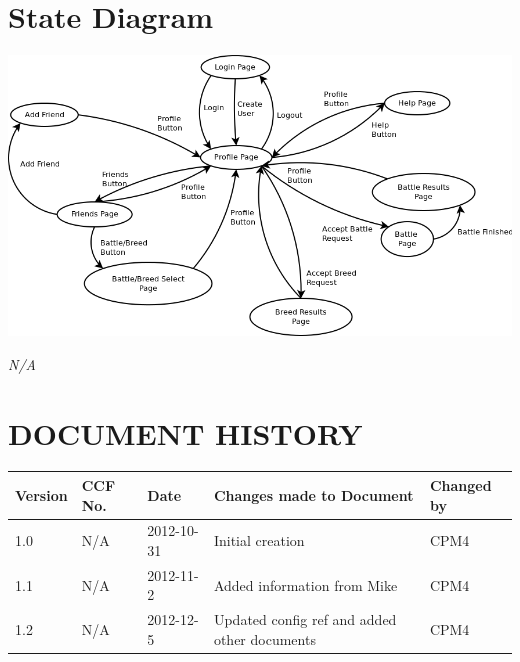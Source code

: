 \documentclass{project}
\begin{document}
\section{State Diagram}
\begin{center}
\includegraphics[scale=0.50]{state_diagram.png}
\end{center}



\clearpage
{}
\begin{thebibliography}{5}
\bibitem{} \emph{N/A}
\end{thebibliography}
\clearpage
{}
\section*{DOCUMENT HISTORY}
\begin{tabular}{|l | l | l | l | l |}
\hline
Version & CCF No. & Date & Changes made to Document & Changed by \\
\hline
1.0 & N/A & 2012-10-31 & Initial creation & CPM4 \\
\hline
1.1 & N/A & 2012-11-2 & Added information from Mike & CPM4 \\
\hline
1.2 & N/A & 2012-12-5 & Updated config ref and added other documents & CPM4 \\
\hline
\end{tabular}
\label{thelastpage}
\end{document}
